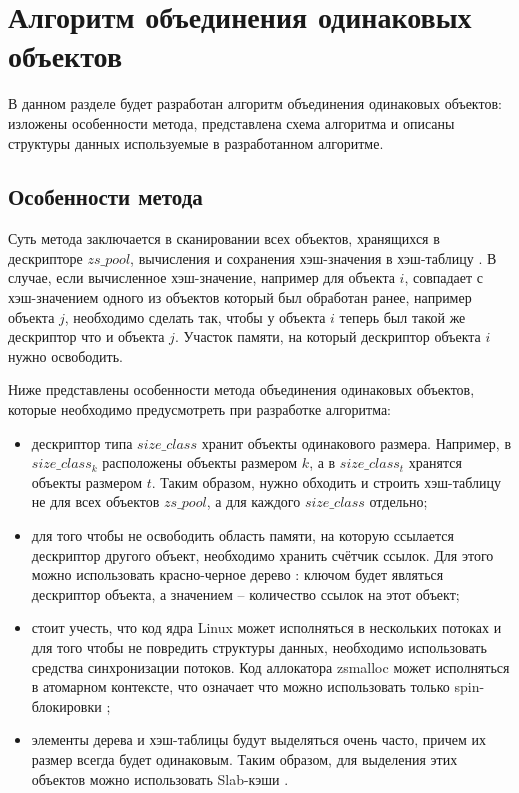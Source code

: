 \section{Алгоритм объединения одинаковых объектов}

В данном разделе будет разработан алгоритм объединения одинаковых объектов: изложены особенности метода, представлена схема алгоритма и описаны структуры данных используемые в разработанном алгоритме.

\subsection{Особенности метода}

Суть метода заключается в сканировании всех объектов, хранящихся в дескрипторе $zs\_pool$, вычисления и сохранения хэш-значения в хэш-таблицу \cite{hash-table}. В случае, если вычисленное хэш-значение, например для объекта $i$, совпадает с хэш-значением одного из объектов который был обработан ранее, например объекта $j$, необходимо сделать так, чтобы у объекта $i$ теперь был такой же дескриптор что и объекта $j$. Участок памяти, на который дескриптор объекта $i$ нужно освободить.

Ниже представлены особенности метода объединения одинаковых объектов, которые необходимо предусмотреть при разработке алгоритма:

\begin{itemize}
	\item дескриптор типа $size\_class$ хранит объекты одинакового размера. Например, в $size\_class_{k}$ расположены объекты размером $k$, а в $size\_class_{t}$ хранятся объекты размером $t$. Таким образом, нужно обходить и строить хэш-таблицу не для всех объектов $zs\_pool$, а для каждого $size\_class$ отдельно;
	
	\item для того чтобы не освободить область памяти, на которую ссылается дескриптор другого объект, необходимо хранить счётчик ссылок. Для этого можно использовать красно-черное дерево \cite{rbtree}: ключом будет являться дескриптор объекта, а значением -- количество ссылок на этот объект;
	
	\item стоит учесть, что код ядра Linux может исполняться в нескольких потоках и для того чтобы не повредить структуры данных, необходимо использовать средства синхронизации потоков. Код аллокатора zsmalloc может исполняться в атомарном контексте, что означает что можно использовать только spin-блокировки \cite{spinlock};
	
	\item элементы дерева и хэш-таблицы будут выделяться очень часто, причем их размер всегда будет одинаковым. Таким образом, для выделения этих объектов можно использовать Slab-кэши \cite{slab-cache}. 
\end{itemize}

